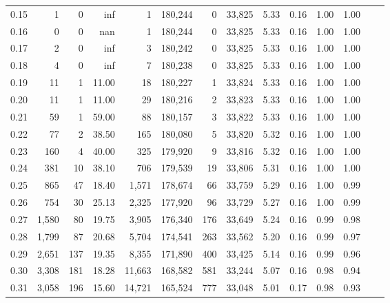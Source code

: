 \begin{tabular}{rrrrrrrrrrrrrr}
0.15 &      1 &      0 &     inf &        1 &  180,244 &       0 &  33,825 &  5.33 &  0.16 &  1.00 &      1.00 \\
0.16 &      0 &      0 &     nan &        1 &  180,244 &       0 &  33,825 &  5.33 &  0.16 &  1.00 &      1.00 \\
0.17 &      2 &      0 &     inf &        3 &  180,242 &       0 &  33,825 &  5.33 &  0.16 &  1.00 &      1.00 \\
0.18 &      4 &      0 &     inf &        7 &  180,238 &       0 &  33,825 &  5.33 &  0.16 &  1.00 &      1.00 \\
0.19 &     11 &      1 &   11.00 &       18 &  180,227 &       1 &  33,824 &  5.33 &  0.16 &  1.00 &      1.00 \\
0.20 &     11 &      1 &   11.00 &       29 &  180,216 &       2 &  33,823 &  5.33 &  0.16 &  1.00 &      1.00 \\
0.21 &     59 &      1 &   59.00 &       88 &  180,157 &       3 &  33,822 &  5.33 &  0.16 &  1.00 &      1.00 \\
0.22 &     77 &      2 &   38.50 &      165 &  180,080 &       5 &  33,820 &  5.32 &  0.16 &  1.00 &      1.00 \\
0.23 &    160 &      4 &   40.00 &      325 &  179,920 &       9 &  33,816 &  5.32 &  0.16 &  1.00 &      1.00 \\
0.24 &    381 &     10 &   38.10 &      706 &  179,539 &      19 &  33,806 &  5.31 &  0.16 &  1.00 &      1.00 \\
0.25 &    865 &     47 &   18.40 &    1,571 &  178,674 &      66 &  33,759 &  5.29 &  0.16 &  1.00 &      0.99 \\
0.26 &    754 &     30 &   25.13 &    2,325 &  177,920 &      96 &  33,729 &  5.27 &  0.16 &  1.00 &      0.99 \\
0.27 &  1,580 &     80 &   19.75 &    3,905 &  176,340 &     176 &  33,649 &  5.24 &  0.16 &  0.99 &      0.98 \\
0.28 &  1,799 &     87 &   20.68 &    5,704 &  174,541 &     263 &  33,562 &  5.20 &  0.16 &  0.99 &      0.97 \\
0.29 &  2,651 &    137 &   19.35 &    8,355 &  171,890 &     400 &  33,425 &  5.14 &  0.16 &  0.99 &      0.96 \\
0.30 &  3,308 &    181 &   18.28 &   11,663 &  168,582 &     581 &  33,244 &  5.07 &  0.16 &  0.98 &      0.94 \\
0.31 &  3,058 &    196 &   15.60 &   14,721 &  165,524 &     777 &  33,048 &  5.01 &  0.17 &  0.98 &      0.93 \\

\end{tabular}
